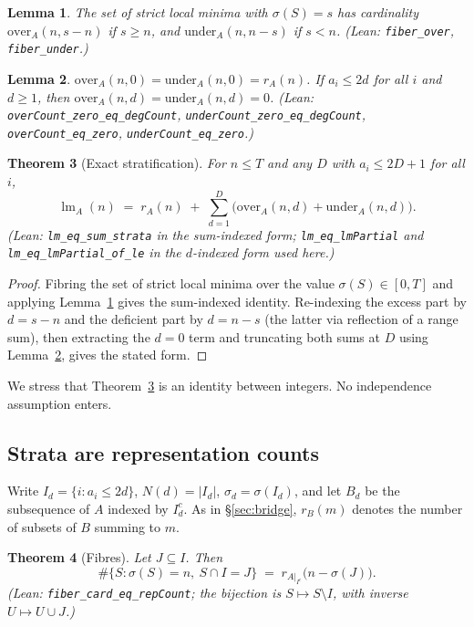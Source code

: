 \documentclass[11pt,a4paper]{article}
\theoremstyle{plain}
\newtheorem{theorem}{Theorem}[section]
\newtheorem{lemma}[theorem]{Lemma}
\theoremstyle{definition}
\theoremstyle{remark}
\DeclareMathOperator{\lm}{lm}
\newcommand{\ovr}{\mathrm{over}}
\newcommand{\undr}{\mathrm{under}}
\newcommand{\Lean}[1]{\texttt{#1}}
\begin{document}
\begin{lemma}\label{lem:fibers}
The set of strict local minima with $\sigma(S)=s$ has cardinality
$\ovr_A(n,s-n)$ if $s\ge n$, and $\undr_A(n,n-s)$ if $s<n$.
\textup{(Lean: \Lean{fiber\_over}, \Lean{fiber\_under}.)}
\end{lemma}

\begin{lemma}\label{lem:vanishing}
$\ovr_A(n,0)=\undr_A(n,0)=r_A(n)$. If $a_i\le2d$ for all $i$ and $d\ge1$,
then $\ovr_A(n,d)=\undr_A(n,d)=0$.
\textup{(Lean: \Lean{overCount\_zero\_eq\_degCount},
\Lean{underCount\_zero\_eq\_degCount}, \Lean{overCount\_eq\_zero},
\Lean{underCount\_eq\_zero}.)}
\end{lemma}

\begin{theorem}[Exact stratification]\label{thm:stratification}
For $n\le T$ and any $D$ with $a_i\le2D+1$ for all $i$,
\[
  \lm_A(n)\;=\;r_A(n)\;+\;\sum_{d=1}^{D}\bigl(\ovr_A(n,d)+\undr_A(n,d)\bigr).
\]
\textup{(Lean: \Lean{lm\_eq\_sum\_strata} in the sum-indexed form;
\Lean{lm\_eq\_lmPartial} and \Lean{lm\_eq\_lmPartial\_of\_le} in the
$d$-indexed form used here.)}
\end{theorem}

\begin{proof}
Fibring the set of strict local minima over the value $\sigma(S)\in[0,T]$ and
applying Lemma~\ref{lem:fibers} gives the sum-indexed identity. Re-indexing the
excess part by $d=s-n$ and the deficient part by $d=n-s$ (the latter via
reflection of a range sum), then extracting the $d=0$ term and truncating both
sums at $D$ using Lemma~\ref{lem:vanishing}, gives the stated form.
\end{proof}

We stress that Theorem~\ref{thm:stratification} is an identity between integers.
No independence assumption enters.

\subsection{Strata are representation counts}

Write $I_d=\{i:a_i\le2d\}$, $N(d)=|I_d|$, $\sigma_d=\sigma(I_d)$, and let $B_d$
be the subsequence of $A$ indexed by $I_d^{c}$. As in \S\ref{sec:bridge},
$r_{B}(m)$ denotes the number of subsets of $B$ summing to $m$.

\begin{theorem}[Fibres]\label{thm:fiber-rep}
Let $J\subseteq I$. Then
\[
  \#\{S:\sigma(S)=n,\ S\cap I=J\}\;=\;r_{A|_{I^{c}}}\bigl(n-\sigma(J)\bigr).
\]
\textup{(Lean: \Lean{fiber\_card\_eq\_repCount}; the bijection is
$S\mapsto S\setminus I$, with inverse $U\mapsto U\cup J$.)}
\end{theorem}
\end{document}
